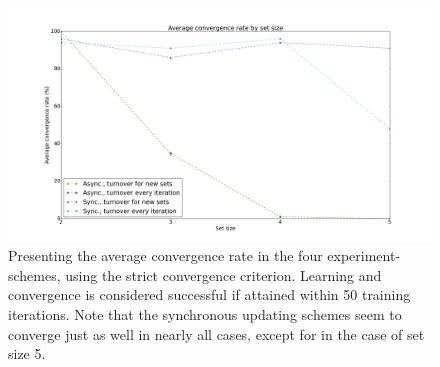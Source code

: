 \begin{figure}
    \centering
    \includegraphics[width=14cm]{fig/avg_convergence_rate}
    \caption{Presenting the average convergence rate in the four experiment-schemes, using the strict convergence criterion. Learning and convergence is considered successful if attained within 50 training iterations. Note that the synchronous updating schemes seem to converge just as well in nearly all cases, except for in the case of set size 5.}
    \label{fig:convergence_rates_async_sync}
\end{figure}

